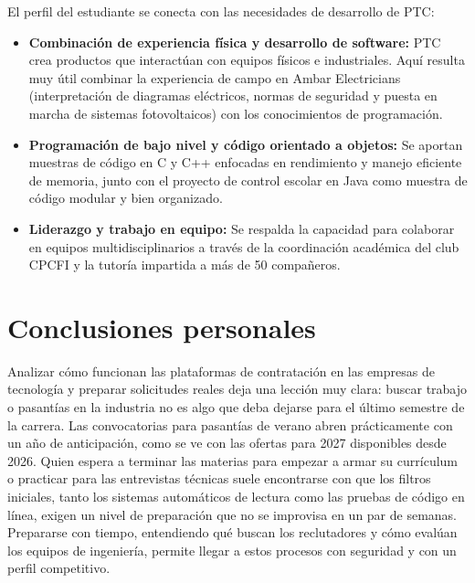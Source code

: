 \documentclass[12pt]{article}
\begin{document}
El perfil del estudiante se conecta con las necesidades de desarrollo de PTC:
\begin{itemize}[leftmargin=0.2in, itemsep=0.3em]
    \item \textbf{Combinación de experiencia física y desarrollo de software:} PTC crea productos que interactúan con equipos físicos e industriales. Aquí resulta muy útil combinar la experiencia de campo en Ambar Electricians (interpretación de diagramas eléctricos, normas de seguridad y puesta en marcha de sistemas fotovoltaicos) con los conocimientos de programación.
    \item \textbf{Programación de bajo nivel y código orientado a objetos:} Se aportan muestras de código en C y C++ enfocadas en rendimiento y manejo eficiente de memoria, junto con el proyecto de control escolar en Java como muestra de código modular y bien organizado.
    \item \textbf{Liderazgo y trabajo en equipo:} Se respalda la capacidad para colaborar en equipos multidisciplinarios a través de la coordinación académica del club CPCFI y la tutoría impartida a más de 50 compañeros.
\end{itemize}

\section{Conclusiones personales}
\label{sec:conclusionesPersonales}

Analizar cómo funcionan las plataformas de contratación en las empresas de tecnología y preparar solicitudes reales deja una lección muy clara: buscar trabajo o pasantías en la industria no es algo que deba dejarse para el último semestre de la carrera. Las convocatorias para pasantías de verano abren prácticamente con un año de anticipación, como se ve con las ofertas para 2027 disponibles desde 2026. Quien espera a terminar las materias para empezar a armar su currículum o practicar para las entrevistas técnicas suele encontrarse con que los filtros iniciales, tanto los sistemas automáticos de lectura como las pruebas de código en línea, exigen un nivel de preparación que no se improvisa en un par de semanas. Prepararse con tiempo, entendiendo qué buscan los reclutadores y cómo evalúan los equipos de ingeniería, permite llegar a estos procesos con seguridad y con un perfil competitivo.
\end{document}
